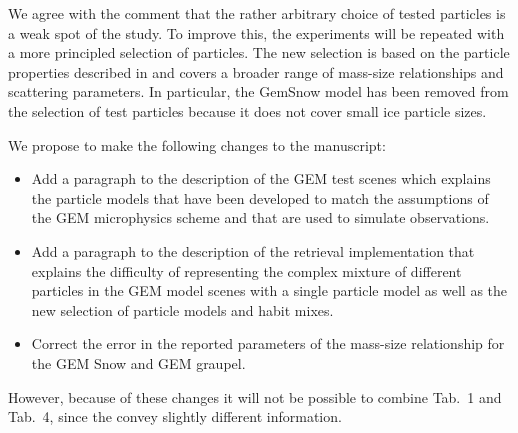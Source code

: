 \documentclass[11pt]{scrartcl}
\begin{document}
We agree with the comment that the rather arbitrary choice of tested particles
is a weak spot of the study. To improve this, the experiments will be repeated
with a more principled selection of particles. The new selection is based on the
particle properties described in \citet{ekelund19} and covers a broader range of
mass-size relationships and scattering parameters. In particular, the GemSnow
model has been removed from the selection of test particles because it does not
cover small ice particle sizes.

We propose to make the following changes to the manuscript:

\begin{itemize}
\item Add a paragraph to the description of the GEM test scenes which explains
  the particle models that have been developed to match the assumptions of
  the GEM microphysics scheme and that are used to simulate observations.
\item Add a paragraph to the description of the retrieval implementation that
  explains the difficulty of representing the complex mixture of different
  particles in the GEM model scenes with a single particle model as well as
  the new selection of particle models and habit mixes.
\item Correct the error in the reported parameters of the mass-size
  relationship for the GEM Snow and GEM graupel.
\end{itemize}

However, because of these changes it will not be possible to combine Tab.~1 and
Tab.~4, since the convey slightly different information.
\end{document}
